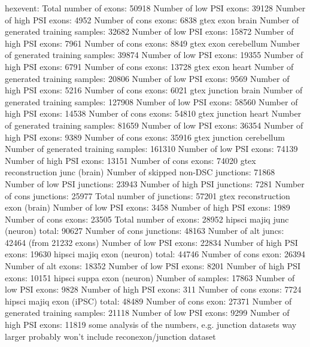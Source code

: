 hexevent:
Total number of exons: 50918
Number of low PSI exons: 39128
Number of high PSI exons: 4952
Number of cons exons: 6838
gtex exon brain
Number of generated training samples: 32682
Number of low PSI exons: 15872
Number of high PSI exons: 7961
Number of cons exons: 8849
gtex exon cerebellum
Number of generated training samples: 39874
Number of low PSI exons: 19355
Number of high PSI exons: 6791
Number of cons exons: 13728
gtex exon heart
Number of generated training samples: 20806
Number of low PSI exons: 9569
Number of high PSI exons: 5216
Number of cons exons: 6021
gtex junction brain
Number of generated training samples: 127908
Number of low PSI exons: 58560
Number of high PSI exons: 14538
Number of cons exons: 54810
gtex junction heart
Number of generated training samples: 81659
Number of low PSI exons: 36354
Number of high PSI exons: 9389
Number of cons exons: 35916
gtex junction cerebellum
Number of generated training samples: 161310
Number of low PSI exons: 74139
Number of high PSI exons: 13151
Number of cons exons: 74020
gtex reconstruction junc (brain)
Number of skipped non-DSC junctions: 71868
Number of low PSI junctions: 23943
Number of high PSI junctions: 7281
Number of cons junctions: 25977
Total number of junctions: 57201
gtex reconstruction exon (brain)
Number of low PSI exons: 3458
Number of high PSI exons: 1989
Number of cons exons: 23505
Total number of exons: 28952
hipsci majiq junc (neuron)
total: 90627
Number of cons junctions: 48163
Number of alt juncs: 42464 (from 21232 exons)
Number of low PSI exons: 22834
Number of high PSI exons: 19630
hipsci majiq exon (neuron)
total: 44746
Number of cons exon: 26394
Number of alt exons: 18352
Number of low PSI exons: 8201
Number of high PSI exons: 10151
hipsci suppa exon (neuron)
Number of samples: 17863
Number of low PSI exons: 9828
Number of high PSI exons: 311
Number of cons exons: 7724
hipsci majiq exon (iPSC)
total: 48489
Number of cons exon: 27371
Number of generated training samples: 21118
Number of low PSI exons: 9299
Number of high PSI exons: 11819
some analysis of the numbers, e.g. junction datasets way larger
probably won't include reconexon/junction dataset


